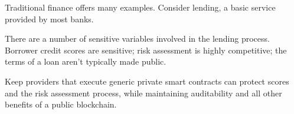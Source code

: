 \documentclass[11pt]{article}
\begin{document}
Traditional finance offers many examples. Consider lending, a basic
service provided by most banks.

There are a number of sensitive variables involved in the lending
process. Borrower credit scores are sensitive; risk assessment is
highly competitive; the terms of a loan aren’t typically made public.

Keep providers that execute generic private smart contracts can
protect scores and the risk assessment process, while maintaining
auditability and all other benefits of a public blockchain.


{}
\end{document}

